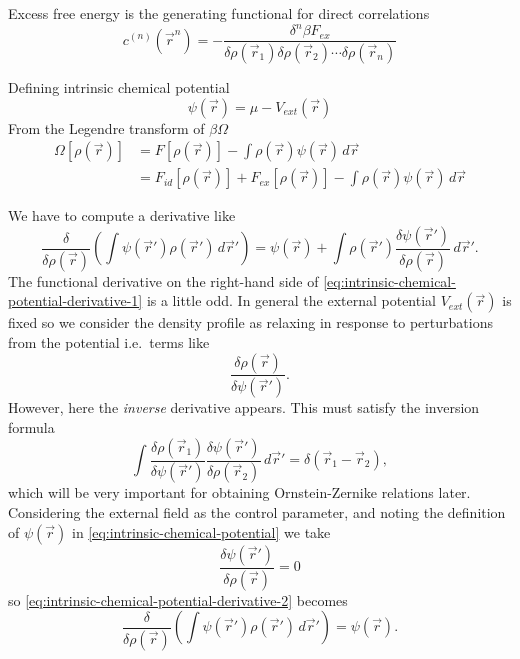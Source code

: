 \documentclass[12pt]{report}
\begin{document}
Excess free energy is the generating functional for direct correlations
\begin{equation}\label{eq:direct-correlations}
  c^{(n)}(\vec{r}^n) =
  - \frac{\delta^n \beta F_{ex}}{\delta \rho(\vec{r}_1)\delta \rho(\vec{r}_2) \cdots \delta \rho(\vec{r}_n)}
\end{equation}

Defining intrinsic chemical potential
\begin{equation}\label{eq:intrinsic-chemical-potential}
  \psi(\vec{r}) = \mu - V_{ext}(\vec{r})
\end{equation}
From the Legendre transform of $\beta \Omega$
\begin{equation}
  \begin{aligned}
    \Omega[\rho(\vec{r})] &=
    F[\rho(\vec{r})] -
    \int \rho(\vec{r}) \psi(\vec{r}) \, d\vec{r} \\
    &=
    F_{id}[\rho(\vec{r})] +
    F_{ex}[\rho(\vec{r})] -
    \int \rho(\vec{r}) \psi(\vec{r}) \, d\vec{r}
  \end{aligned}
\end{equation}

We have to compute a derivative like
\begin{equation}\label{eq:intrinsic-chemical-potential-derivative-1}
  \frac{\delta}{\delta\rho(\vec{r})}
  \left(
  \int \psi(\vec{r}') \rho(\vec{r}') \, d\vec{r}'
  \right)
  =
  \psi(\vec{r}) +
  \int
  \rho(\vec{r}') \frac{\delta\psi(\vec{r}')}{\delta\rho(\vec{r})}
  \, d\vec{r}'.
\end{equation}
The functional derivative on the right-hand side of \eqref{eq:intrinsic-chemical-potential-derivative-1} is a little odd.
In general the external potential $V_{ext}(\vec{r})$%
is fixed so we consider the density profile as relaxing in response to perturbations from the potential i.e.\ terms like \[ \frac{\delta \rho(\vec{r})}{\delta \psi(\vec{r}')}. \]
However, here the \emph{inverse} derivative appears.
This must satisfy the inversion formula
\begin{equation}\label{eq:intrinsic-chemical-potential-inverse-derivative}
  \int
  \frac{\delta \rho(\vec{r}_1)}{\delta \psi(\vec{r}')}
  \frac{\delta \psi(\vec{r}')}{\delta \rho(\vec{r}_2)}
  \, d\vec{r}' =
  \delta(\vec{r}_1 - \vec{r}_2),
\end{equation}
which will be very important for obtaining Ornstein-Zernike relations later.
Considering the external field as the control parameter, and noting the definition of $\psi(\vec{r})$ in \eqref{eq:intrinsic-chemical-potential} we take
\begin{equation*}
  \frac{\delta\psi(\vec{r}')}{\delta\rho(\vec{r})} = 0
\end{equation*}
so \eqref{eq:intrinsic-chemical-potential-derivative-2} becomes
\begin{equation}\label{eq:intrinsic-chemical-potential-derivative-2}
  \frac{\delta}{\delta\rho(\vec{r})}
  \left(
  \int \psi(\vec{r}') \rho(\vec{r}') \, d\vec{r}'
  \right)
  =
  \psi(\vec{r}).
\end{equation}
\end{document}
